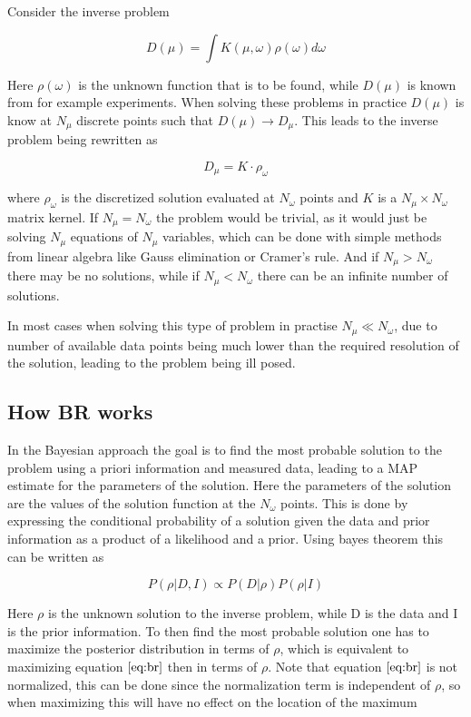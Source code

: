 \documentclass[a4paper, oneside, 12pt]{book}
\begin{document}
Consider the inverse problem

\begin{equation}
D(\mu) = \int K(\mu,\omega)\rho(\omega)d\omega
\end{equation}

Here  $\rho(\omega)$ is the unknown function that is to be found, while $D(\mu)$ is known from for example experiments.
When solving these problems in practice $D(\mu)$ is know at $N_{\mu}$ discrete points such that $D(\mu) \rightarrow D_{\mu}$. This leads to the inverse problem being rewritten as

\begin{equation}
D_{\mu} = K\cdot\rho_{\omega}
\end{equation}

where $\rho_{\omega}$ is the discretized solution evaluated at $N_{\omega}$ points and $K$ is a $N_{\mu} \times N_{\omega}$ matrix kernel. If $N_{\mu} = N_{\omega}$ the problem would be trivial, as it would just be solving $N_{\mu}$ equations of $N_{\mu}$ variables, which can be done with simple methods from linear algebra like Gauss elimination or Cramer's rule. And if $N_{\mu} > N_{\omega}$ there may be no solutions, while if $N_{\mu} < N_{\omega}$ there can be an infinite number of solutions.

In most cases when solving this type of problem in practise $N_{\mu} \ll N_{\omega}$, due to number of available data points being much lower than the required resolution of the solution, leading to the problem being ill posed.

\subsection{How BR works}
In the Bayesian approach the goal is to find the most probable solution to the problem using a priori information and measured data, leading to a MAP estimate for the parameters of the solution. Here the parameters of the solution are the values of the solution function at the $N_{\omega}$ points. This is done by expressing the conditional probability of a solution given the data and prior information as a product of a likelihood and a prior. Using bayes theorem this can be written as

\begin{equation}
\label{eq:br}
P(\rho|D,I) \propto P(D|\rho)P(\rho|I)
\end{equation}

Here $\rho$ is the unknown solution to the inverse problem, while D is the data and I is the prior information. To then find the most probable solution one has to maximize the posterior distribution in terms of $\rho$, which is equivalent to maximizing equation $\ref{eq:br}$ then in terms of $\rho$. Note that equation $\ref{eq:br}$ is not normalized, this can be done since the normalization term is independent of $\rho$, so when maximizing this will have no effect on the location of the maximum
\end{document}
